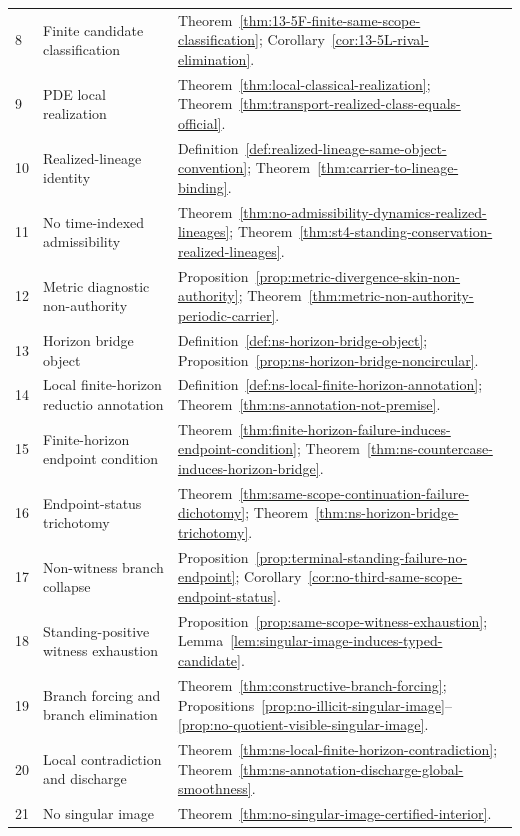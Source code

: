 \begin{center}
\begin{tabularx}{0.98\textwidth}{@{}L{0.08\textwidth}L{0.27\textwidth}Y@{}}
8 & Finite candidate classification & Theorem~\ref{thm:13-5F-finite-same-scope-classification}; Corollary~\ref{cor:13-5L-rival-elimination}.\\
9 & PDE local realization & Theorem~\ref{thm:local-classical-realization}; Theorem~\ref{thm:transport-realized-class-equals-official}.\\
10 & Realized-lineage identity & Definition~\ref{def:realized-lineage-same-object-convention}; Theorem~\ref{thm:carrier-to-lineage-binding}.\\
11 & No time-indexed admissibility & Theorem~\ref{thm:no-admissibility-dynamics-realized-lineages}; Theorem~\ref{thm:st4-standing-conservation-realized-lineages}.\\
12 & Metric diagnostic non-authority & Proposition~\ref{prop:metric-divergence-skin-non-authority}; Theorem~\ref{thm:metric-non-authority-periodic-carrier}.\\
13 & Horizon bridge object & Definition~\ref{def:ns-horizon-bridge-object}; Proposition~\ref{prop:ns-horizon-bridge-noncircular}.\\
14 & Local finite-horizon reductio annotation & Definition~\ref{def:ns-local-finite-horizon-annotation}; Theorem~\ref{thm:ns-annotation-not-premise}.\\
15 & Finite-horizon endpoint condition & Theorem~\ref{thm:finite-horizon-failure-induces-endpoint-condition}; Theorem~\ref{thm:ns-countercase-induces-horizon-bridge}.\\
16 & Endpoint-status trichotomy & Theorem~\ref{thm:same-scope-continuation-failure-dichotomy}; Theorem~\ref{thm:ns-horizon-bridge-trichotomy}.\\
17 & Non-witness branch collapse & Proposition~\ref{prop:terminal-standing-failure-no-endpoint}; Corollary~\ref{cor:no-third-same-scope-endpoint-status}.\\
18 & Standing-positive witness exhaustion & Proposition~\ref{prop:same-scope-witness-exhaustion}; Lemma~\ref{lem:singular-image-induces-typed-candidate}.\\
19 & Branch forcing and branch elimination & Theorem~\ref{thm:constructive-branch-forcing}; Propositions~\ref{prop:no-illicit-singular-image}--\ref{prop:no-quotient-visible-singular-image}.\\
20 & Local contradiction and discharge & Theorem~\ref{thm:ns-local-finite-horizon-contradiction}; Theorem~\ref{thm:ns-annotation-discharge-global-smoothness}.\\
21 & No singular image & Theorem~\ref{thm:no-singular-image-certified-interior}.\\

\end{tabularx}
\end{center}
